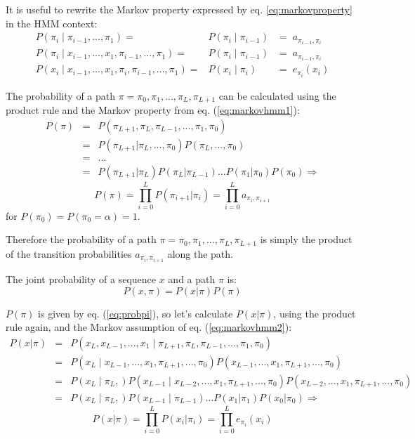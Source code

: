 It is useful to rewrite the Markov property expressed by eq. \ref{eq:markovproperty} in the HMM context:
\begin{eqnarray}
P(\pi_i \; | \; \pi_{i-1}, ..., \pi_1) 
  = &  P(\pi_i \; | \; \pi_{i-1}) 
 & = \; a_{\pi_{i-1},\pi_i} \label{eq:markovhmm1}
\\
P(\pi_i \; | \; x_{i-1}, ..., x_1, \pi_{i-1}, ..., \pi_1) 
  = &  P(\pi_i \; | \; \pi_{i-1}) 
 & = \; a_{\pi_{i-1},\pi_i} \label{eq:markovhmm3}
\\
P(x_i \; | \; x_{i-1}, ..., x_1, \pi_{i}, \pi_{i-1}, ... , \pi_1) 
  = & P(x_i \; | \; \pi_{i}) 
 & = \; e_{\pi_i}(x_i) \label{eq:markovhmm2}
\end{eqnarray}

The probability of a path $\pi = \pi_0, \pi_1, ..., \pi_L, \pi_{L+1}$ can be calculated using the product rule and the Markov property from eq. (\ref{eq:markovhmm1}):
\begin{eqnarray}
P(\pi) & = & P(\pi_{L+1}, \pi_L, \pi_{L-1}, ..., \pi_1, \pi_0) \nonumber \\
     & = & P(\pi_{L+1}| \pi_L, ..., \pi_0) P(\pi_L, ..., \pi_0)  \nonumber \\
     & = & ...  \nonumber \\
     & = & P(\pi_{L+1}| \pi_L) P(\pi_L | \pi_{L-1}) ... P(\pi_1 | \pi_0) P(\pi_0) 
\Rightarrow  \nonumber
\end{eqnarray}
\begin{equation}
\boxed{P(\pi) = \prod_{i=0}^L P(\pi_{i+1}| \pi_i) = 
\prod_{i=0}^L a_{\pi_{i},\pi_{i+1}}}
\label{eq:probpi}
\end{equation}
for $P(\pi_0) = P(\pi_0=\alpha)=1$.

Therefore the probability of a path $\pi = \pi_0, \pi_1, ..., \pi_L, \pi_{L+1}$ is simply the product of the transition probabilities $a_{\pi_{i},\pi_{i+1}}$ along the path.

The joint probability of a sequence $x$ and a path $\pi$ is:
\begin{equation}
P(x,\pi) = P(x | \pi) P(\pi)
\label{eq:probxpi}
\end{equation}

$P(\pi)$ is given by eq. (\ref{eq:probpi}), so let's calculate $P(x | \pi)$,
using the product rule again, and the Markov assumption of eq. (\ref{eq:markovhmm2}):
\begin{eqnarray}
P(x | \pi) & = & 
P(x_L, x_{L-1}, ..., x_1 \; | \; \pi_{L+1}, \pi_L, \pi_{L-1}, ..., \pi_1, \pi_0)
\nonumber \\
  & = & 
P(x_L \; | \; x_{L-1}, ..., x_1, \pi_{L+1}, ..., \pi_0)
P(x_{L-1}, ..., x_1, \pi_{L+1}, ..., \pi_0)
\nonumber \\
  & = & 
P(x_L \; | \; \pi_L,)
P(x_{L-1} \; | \; x_{L-2}, ..., x_1, \pi_{L+1}, ..., \pi_0)
P(x_{L-2}, ..., x_1, \pi_{L+1}, ...,\pi_0)
\nonumber \\
  & = & 
P(x_L \; | \; \pi_L,) P(x_{L-1} \; | \; \pi_{L-1}) ... P(x_1 | \pi_1) P(x_0 | \pi_0) 
\Rightarrow  \nonumber
\end{eqnarray}
\begin{equation}
\boxed{P(x | \pi) = \prod_{i=0}^L P(x_{i} | \pi_i) = 
\prod_{i=0}^L e_{\pi_{i}}(x_i)}
\label{eq:probxgivenpi}
\end{equation}

